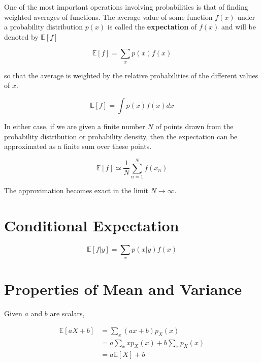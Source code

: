 One of the most important operations involving probabilities is that of finding weighted averages of functions. The average value of some function $f(x)$ under a probability distribution $p(x)$ is called the \textbf{expectation} of $f(x)$ and will be denoted by $\mathbb{E}[f]$

\begin{equation}
    \mathbb{E}[f] = \sum_x p(x)f(x)
\end{equation}

so that the average is weighted by the relative probabilities of the different values of $x$.

\begin{equation}
    \mathbb{E}[f] = \int p(x)f(x)dx
\end{equation}

In either case, if we are given a finite number $N$ of points drawn from the probability distribution or probability density, then the expectation can be approximated as a finite sum over these points. 

\begin{equation}
       \mathbb{E}[f] \simeq \frac{1}{N}\sum_{n=1}^N f(x_n) 
\end{equation}

The approximation becomes exact in the limit $N \rightarrow \infty$.

\section{Conditional Expectation}

\begin{equation}
    \mathbb{E}[f | y] = \sum_x p(x | y)f(x)
\end{equation}

\section{Properties of Mean and Variance}

Given $a$ and $b$ are scalars,

\begin{equation}
    \begin{split}
        \mathbb{E}[aX + b] & = \sum_x (ax + b)p_X(x)\\
         & = a \sum_x xp_X(x) + b\sum_x p_X(x)\\
         & = a \mathbb{E}[X] + b
    \end{split}
\end{equation}

